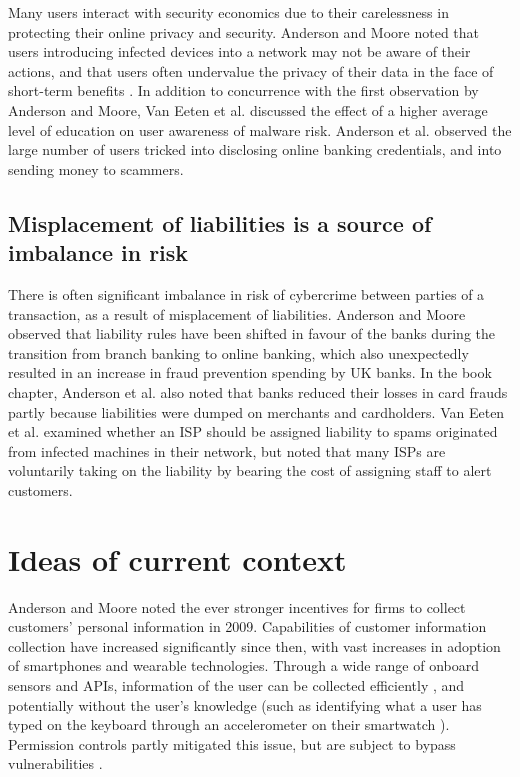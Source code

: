 \documentclass[11pt]{article}
\begin{document}
Many users interact with security economics due to their carelessness in protecting their online privacy and security. Anderson and Moore \cite[Sec. 1]{anderson2009information} noted that users introducing infected devices into a network may not be aware of their actions, and that users often undervalue the privacy of their data in the face of short-term benefits \cite[Sec. 5]{anderson2009information}. In addition to concurrence with the first observation by Anderson and Moore, Van Eeten et al. \cite[p. 2, pp. 19-24]{van2010role} discussed the effect of a higher average level of education on user awareness of malware risk. Anderson et al. \cite[12.3.2, 12.3.8]{anderson2013measuring} observed the large number of users tricked into disclosing online banking credentials, and into sending money to scammers.

\subsection{Misplacement of liabilities is a source of imbalance in risk}

There is often significant imbalance in risk of cybercrime between parties of a transaction, as a result of misplacement of liabilities. Anderson and Moore \cite[Sec. 2]{anderson2009information} observed that liability rules have been shifted in favour of the banks during the transition from branch banking to online banking, which also unexpectedly resulted in an increase in fraud prevention spending by UK banks. In the book chapter, Anderson et al. \cite[12.3.1]{anderson2013measuring} also noted that banks reduced their losses in card frauds partly because liabilities were dumped on merchants and cardholders. Van Eeten et al. \cite[p. 3]{van2010role} examined whether an ISP should be assigned liability to spams originated from infected machines in their network, but noted that many ISPs are voluntarily taking on the liability by bearing the cost of assigning staff to alert customers.  

\section{Ideas of current context}

Anderson and Moore \cite[Sec. 5]{anderson2009information} noted the ever stronger incentives for firms to collect customers' personal information in 2009. Capabilities of customer information collection have increased significantly since then, with vast increases in adoption of smartphones and wearable technologies. Through a wide range of onboard sensors and APIs, information of the user can be collected efficiently \cite{wagner2014device}, and potentially without the user's knowledge (such as identifying what a user has typed on the keyboard through an accelerometer on their smartwatch \cite{wang2015mole}). Permission controls partly mitigated this issue, but are subject to bypass vulnerabilities \cite{fang2014permission}. 
\end{document}
